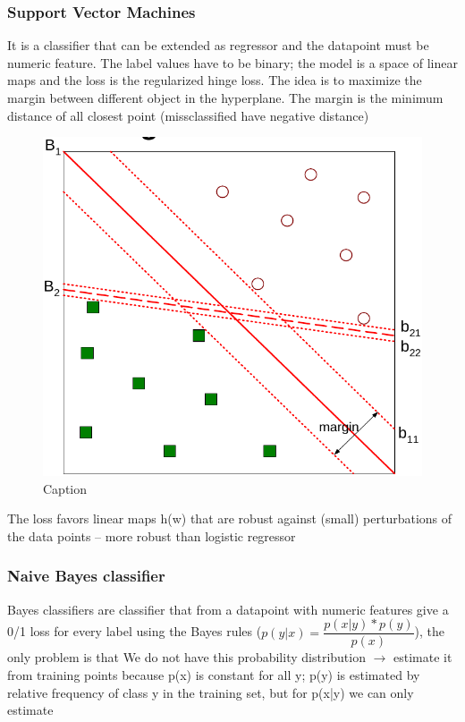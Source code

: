 \subsubsection{Support Vector Machines}

It is a classifier that can be extended as regressor and the datapoint must be numeric feature. The label values have to be binary; the model is a space of linear maps and the loss is the regularized hinge loss. The idea is to maximize the margin between different object in the hyperplane. The margin is the minimum distance of all closest point (missclassified have negative distance)
\begin{figure}[H]
    \centering
    \includegraphics[scale=0.3]{images/GB/GB3.png}
    \caption{Caption}
    \label{fig:enter-label}
\end{figure}

The loss favors linear maps h(w) that are robust against (small) perturbations of the data points – more robust than logistic regressor

\subsubsection{Naive Bayes classifier}

Bayes classifiers are classifier that from a datapoint with numeric features give a 0/1 loss for every label using the Bayes rules ($ p(y|x) = \dfrac{p(x|y)* p(y)}{p(x)}$), the only problem is that We do not have this probability distribution $\rightarrow$ estimate it from training points because p(x) is constant for all y; p(y) is estimated by relative frequency of class y in the training set, but for p(x|y) we can only estimate

